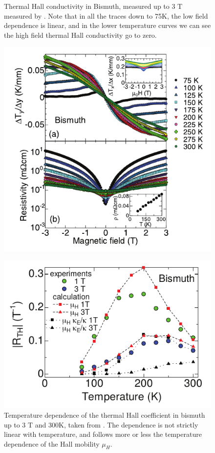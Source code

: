 \documentclass{thesis-umich}
\begin{document}
\begin{figure}
	\centering
	\begin{minipage}{.45\linewidth}
	\caption[Thermal Hall conductivity in Bismuth up to 3 T]{Thermal Hall conductivity in Bismuth, measured up to 3 T measured by \cite{Kobayashi2012}. Note that in all the traces down to 75K, the low field dependence is linear, and in the lower temperature curves we can see the high field thermal Hall conductivity go to zero.}
	\label{fig:kobayashi1}
	\includegraphics[width=\linewidth]{figures/kobayashi12_fig1.pdf}
	\end{minipage}
	\hspace{.05\linewidth}
	\begin{minipage}{.45\linewidth}
		\caption[Temperature dependence of $R_{TH}$ in bismuth up to 3 T]{Temperature dependence of the thermal Hall coefficient in bismuth up to 3 T and 300K, taken from \cite{Kobayashi2012}. The dependence is not strictly linear with temperature, and follows more or less the temperature dependence of the Hall mobility $\mu_H$.}
	\label{fig:kobayashi2}
	\includegraphics[width=\linewidth]{figures/kobayashi12_fig2.pdf}
	\end{minipage}
\end{figure}
\end{document}
